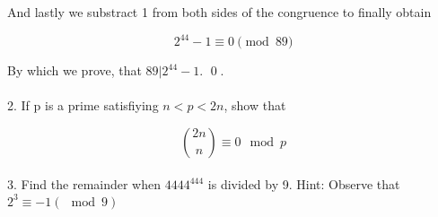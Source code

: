 \documentclass{article}
\begin{document}
And lastly we substract 1 from both sides of the congruence to finally obtain

$$2^{44} - 1 \equiv 0 \pmod{89}$$

By which we prove, that $89|2^{44} - 1$. \qed.

\paragraph{}2. If p is a prime satisfiying $n<p<2n$, show that

$$\binom{2n}{n} \equiv 0\mod{p} $$

\paragraph{}3. Find the remainder when $4444^{444}$ is divided by 9. Hint: Observe that $2^{3} \equiv -1(\mod{9})$
	
\end{document}
